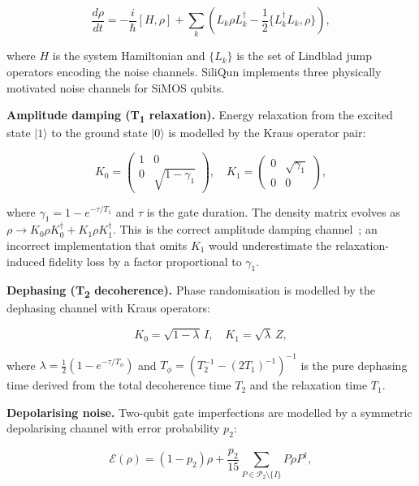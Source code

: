 \begin{equation}
  \frac{d\rho}{dt} = -\frac{i}{\hbar}[H, \rho] + \sum_k \left( L_k \rho L_k^\dagger - \frac{1}{2}\{L_k^\dagger L_k, \rho\} \right),
  \label{eq:lindblad}
\end{equation}

where $H$ is the system Hamiltonian and $\{L_k\}$ is the set of Lindblad jump operators encoding the noise channels. SiliQun implements three physically motivated noise channels for SiMOS qubits.

\textbf{Amplitude damping (T\textsubscript{1} relaxation).} Energy relaxation from the excited state $|1\rangle$ to the ground state $|0\rangle$ is modelled by the Kraus operator pair:

\begin{equation}
  K_0 = \begin{pmatrix} 1 & 0 \\ 0 & \sqrt{1-\gamma_1} \end{pmatrix}, \quad
  K_1 = \begin{pmatrix} 0 & \sqrt{\gamma_1} \\ 0 & 0 \end{pmatrix},
  \label{eq:amplitude_damping}
\end{equation}

where $\gamma_1 = 1 - e^{-\tau/T_1}$ and $\tau$ is the gate duration. The density matrix evolves as $\rho \rightarrow K_0 \rho K_0^\dagger + K_1 \rho K_1^\dagger$. This is the correct amplitude damping channel~\cite{NielsenChuang2000}; an incorrect implementation that omits $K_1$ would underestimate the relaxation-induced fidelity loss by a factor proportional to $\gamma_1$.

\textbf{Dephasing (T\textsubscript{2} decoherence).} Phase randomisation is modelled by the dephasing channel with Kraus operators:

\begin{equation}
  K_0 = \sqrt{1-\lambda} \, I, \quad K_1 = \sqrt{\lambda} \, Z,
  \label{eq:dephasing}
\end{equation}

where $\lambda = \frac{1}{2}(1 - e^{-\tau/T_\phi})$ and $T_\phi = (T_2^{-1} - (2T_1)^{-1})^{-1}$ is the pure dephasing time derived from the total decoherence time $T_2$ and the relaxation time $T_1$.

\textbf{Depolarising noise.} Two-qubit gate imperfections are modelled by a symmetric depolarising channel with error probability $p_2$:

\begin{equation}
  \mathcal{E}(\rho) = (1 - p_2)\rho + \frac{p_2}{15} \sum_{P \in \mathcal{P}_2 \setminus \{I\}} P \rho P^\dagger,
  \label{eq:depolarising}
\end{equation}

